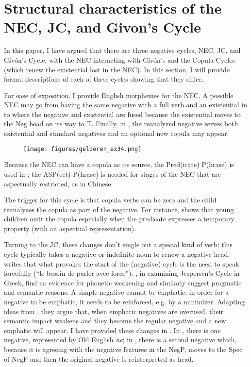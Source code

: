 ﻿\documentclass[output=paper]{langsci/langscibook}
\begin{document}
\section{Structural characteristics of the NEC, JC, and Givon's
Cycle}\label{sec:oth-5}

In this paper, I have argued that there are three negative cycles, NEC, JC, and Givón's Cycle, with the NEC interacting with Givón's and the Copula Cycles (which renew the existential lost in the NEC). In this section, I will provide formal descriptions of each of these cycles showing that they differ.

For ease of exposition, I provide English morphemes for the NEC. A
possible NEC may go from having the same negative with a full verb and an
existential in  to  where the negative
and existential are fused because the existential moves to the Neg head
on its way to T. Finally, in , the reanalyzed negative
serves both existential and standard negatives and an optional new copula
may appear.


\begin{figure}
    \label{ex:key:34}
    \texttt{[image: figures/gelderen\_ex34.png]}
\end{figure}

Because the NEC can have a copula as its source, the Pred(icate) P(hrase)
is used in ; the ASP(ect) P(hrase) is needed for stages of
the NEC that are aspectually restricted, as in Chinese.

The trigger for this cycle is that copula verbs can be zero and the child
reanalyzes the copula as part of the negative. For instance,
\citet{Becker2000} shows that young children omit the copula especially
when the predicate expresses a temporary property (with an aspectual
representation).

Turning to the JC, these changes don't single out a special kind of verb;
this cycle typically takes a negative or indefinite noun to renew a
negative head. \citet[139]{Meillet1912} writes that what provokes the start
of the (negative) cycle is the need to speak forcefully (``le besoin de
parler avec force''). \citet{KiparskyCondoravdi2006}, in examining
Jespersen's Cycle in Greek, find no evidence for phonetic weakening and
similarly suggest pragmatic and semantic reasons. A simple negative cannot
be emphatic; in order for a negative to be emphatic, it needs to be
reinforced, e.g. by a minimizer. Adapting ideas from \citet{Dahl2001}, they
argue that, when emphatic negatives are overused, their semantic impact
weakens and they become the regular negative and a new emphatic will
appear. I have provided these changes in . In
, there is one negative, represented by Old English
\textit{ne}; in , there is a second negative which, because
it is agreeing with the negative features in the NegP, moves to the Spec of
NegP and then the original negative is reinterpreted as head. 
\end{document}
